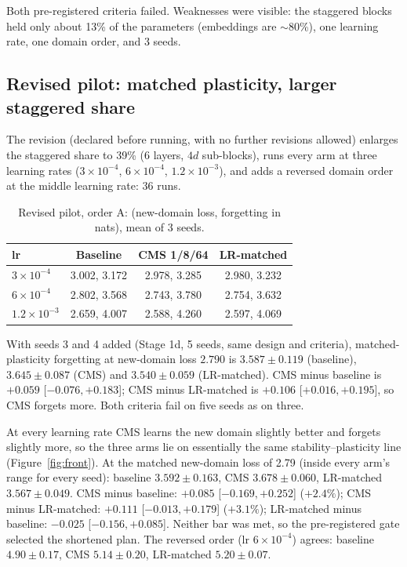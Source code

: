 \documentclass[10pt]{article}
\begin{document}
Both pre-registered criteria failed. Weaknesses were visible: the staggered blocks held only about 13\% of the parameters (embeddings are $\sim$80\%),
one learning rate, one domain order, and 3 seeds.

\subsection{Revised pilot: matched plasticity, larger staggered share}\label{sec:pilot2}
The revision (declared before running, with no further revisions allowed) enlarges the staggered share to 39\% (6 layers, $4d$ sub-blocks),
runs every arm at three learning rates ($3\times10^{-4}$, $6\times10^{-4}$, $1.2\times10^{-3}$), and adds a reversed domain order at the middle learning rate: 36 runs.

\begin{table}[h]\centering\small
\begin{tabular}{lccc}\toprule
lr & Baseline & CMS 1/8/64 & LR-matched\\\midrule
$3\times10^{-4}$ & 3.002, 3.172 & 2.978, 3.285 & 2.980, 3.232\\
$6\times10^{-4}$ & 2.802, 3.568 & 2.743, 3.780 & 2.754, 3.632\\
$1.2\times10^{-3}$ & 2.659, 4.007 & 2.588, 4.260 & 2.597, 4.069\\\bottomrule
\end{tabular}
\caption{Revised pilot, order A: (new-domain loss, forgetting in nats), mean of 3 seeds.}\label{tab:p2}
\end{table}

With seeds 3 and 4 added (Stage 1d, 5 seeds, same design and criteria), matched-plasticity forgetting at new-domain loss $2.790$ is
$3.587\pm0.119$ (baseline), $3.645\pm0.087$ (CMS) and $3.540\pm0.059$ (LR-matched). CMS minus baseline is $+0.059$ [$-0.076,+0.183$];
CMS minus LR-matched is $+0.106$ [$+0.016,+0.195$], so CMS forgets more. Both criteria fail on five seeds as on three.

At every learning rate CMS learns the new domain slightly better and forgets slightly more, so the three arms lie on essentially the same
stability--plasticity line (Figure~\ref{fig:front}). At the matched new-domain loss of 2.79 (inside every arm's range for every seed):
baseline $3.592\pm0.163$, CMS $3.678\pm0.060$, LR-matched $3.567\pm0.049$. CMS minus baseline: $+0.085$ [$-0.169,+0.252$] ($+2.4\%$);
CMS minus LR-matched: $+0.111$ [$-0.013,+0.179$] ($+3.1\%$); LR-matched minus baseline: $-0.025$ [$-0.156,+0.085$]. Neither bar was met, so the pre-registered gate selected the shortened plan.
The reversed order (lr $6\times10^{-4}$) agrees: baseline $4.90\pm0.17$, CMS $5.14\pm0.20$, LR-matched $5.20\pm0.07$.
\end{document}
